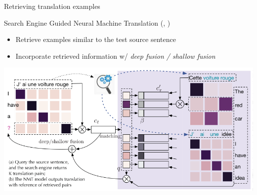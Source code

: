 \documentclass[unicode, 12pt, xdvipdfmx, aspectratio=169]{beamer}
\newcommand{\mycite}[1]{{\scriptsize\reffont({\citeauthor*{#1}, \citeyear{#1}})}}
\begin{document}
\begin{frame}[label={sec:org824430b}]{Retrieving translation examples}
\begin{block}{\small Search Engine Guided Neural Machine Translation \mycite{gu-etal-2018-search}}
\begin{itemize}
\item Retrieve examples similar to the test source sentence
\item Incorporate retrieved information w/ \textit{deep fusion / shallow fusion}
\end{itemize}

\vspace{-0.6cm}
\begin{center}
\includegraphics[width=0.75\linewidth]{./figure/gu-etal-2018-search/Figure1.pdf}
\end{center}
\end{block}
\end{frame}
\end{document}
